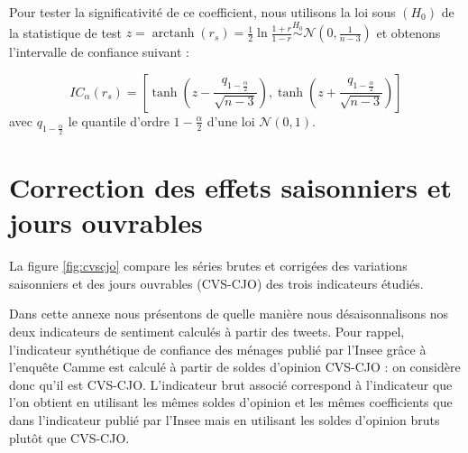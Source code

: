\documentclass[11pt,french,french]{article}
\DeclareMathOperator{\arctanh}{arctanh}
\begin{document}
Pour tester la significativité de ce coefficient, nous utilisons la loi sous \((H_0)\) de la statistique de test \(z = \arctanh(r_s) = \frac{1}{2} \ln\frac{1+r}{1-r} \overset{H_0}{\sim}\mathcal{N}(0, \frac{1}{n-3})\) et obtenons l'intervalle de confiance suivant :

\[
IC_\alpha (r_s) = \left[\tanh\left(z-\frac{q_{1-\frac{\alpha}{2}}}{\sqrt{n-3}}\right),
\tanh\left(z+\frac{q_{1-\frac{\alpha}{2}}}{\sqrt{n-3}}\right)\right]
\]
avec \(q_{1-\frac{\alpha}{2}}\) le quantile d'ordre \(1-\frac{\alpha}{2}\) d'une loi \(\mathcal{N}(0, 1)\).

\newpage

\hypertarget{annexe:cvscjo}{%
\section{Correction des effets saisonniers et jours ouvrables}\label{annexe:cvscjo}}

La figure \ref{fig:cvscjo} compare les séries brutes et corrigées des variations saisonniers et des jours ouvrables (CVS-CJO) des trois indicateurs étudiés.

Dans cette annexe nous présentons de quelle manière nous désaisonnalisons nos deux indicateurs de sentiment calculés à partir des tweets.
Pour rappel, l'indicateur synthétique de confiance des ménages publié par l'Insee grâce à l'enquête Camme est calculé à partir de soldes d'opinion CVS-CJO : on considère donc qu'il est CVS-CJO.
L'indicateur brut associé correspond à l'indicateur que l'on obtient en utilisant les mêmes soldes d'opinion et les mêmes coefficients que dans l'indicateur publié par l'Insee mais en utilisant les soldes d'opinion bruts plutôt que CVS-CJO.
\end{document}
